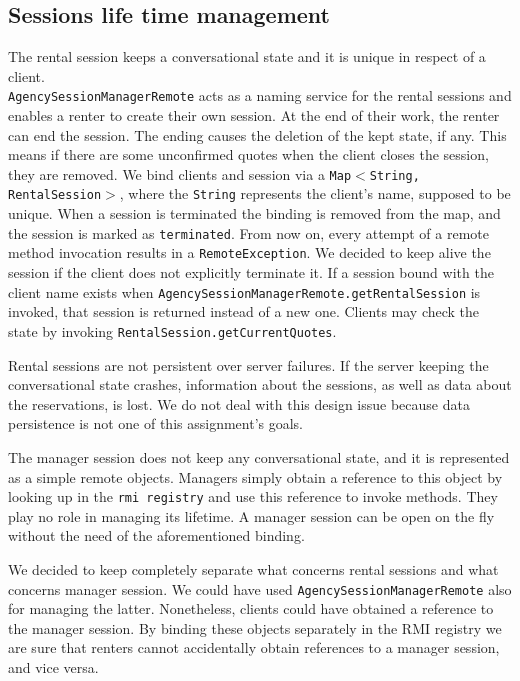 \subsection{Sessions life time management}
The rental session keeps a conversational state and it is unique in respect of a client. \\\texttt{AgencySessionManagerRemote} acts as a naming service for the rental sessions and enables a renter to create their own session. At the end of their work, the renter can end the session. The ending causes the deletion of the kept state, if any. This means if there are some unconfirmed quotes when the client closes the session, they are removed. We bind clients and session via a \texttt{Map$<$String, RentalSession$>$}, where the \texttt{String} represents the client's name, supposed to be unique. When a session is terminated the binding is removed from the map, and the session is marked as \texttt{terminated}. From now on, every attempt of a remote method invocation results in a \texttt{RemoteException}. We decided to keep alive the session if the client does not explicitly terminate it. If a session bound with the client name exists when \texttt{AgencySessionManagerRemote.getRentalSession} is invoked, that session is returned instead of a new one. Clients may check the state by invoking \texttt{RentalSession.getCurrentQuotes}.

Rental sessions are not persistent over server failures. If the server keeping the conversational state crashes, information about the sessions, as well as data about the reservations, is lost. We do not deal with this design issue because data persistence is not one of this assignment's goals. 

The manager session does not keep any conversational state, and it is represented as a simple remote objects. Managers simply obtain a reference to this object by looking up in the \texttt{rmi registry} and use this reference to invoke methods. They play no role in managing its lifetime. A manager session can be open on the fly without the need of the aforementioned binding.

We decided to keep completely separate what concerns rental sessions and what concerns manager session. We could have used \texttt{AgencySessionManagerRemote} also for managing the latter. Nonetheless, clients could have obtained a reference to the manager session. By binding these objects separately in the RMI registry we are sure that renters cannot accidentally obtain references to a manager session, and vice versa.

